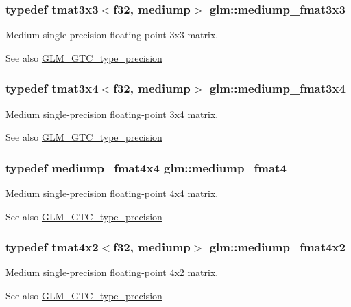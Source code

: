 \subsubsection[{mediump\+\_\+fmat3x3}]{\setlength{\rightskip}{0pt plus 5cm}typedef tmat3x3$<${\bf f32}, mediump$>$ {\bf glm\+::mediump\+\_\+fmat3x3}}\label{namespaceglm_a7719af89d88d87c3b60d7c9f06801711}
Medium single-\/precision floating-\/point 3x3 matrix. \begin{DoxySeeAlso}{See also}
\hyperlink{group__gtc__type__precision}{G\+L\+M\+\_\+\+G\+T\+C\+\_\+type\+\_\+precision} 
\end{DoxySeeAlso}
\hypertarget{namespaceglm_a02c8a6eb751559f13a412467d2241c6e}{}
\subsubsection[{mediump\+\_\+fmat3x4}]{\setlength{\rightskip}{0pt plus 5cm}typedef tmat3x4$<${\bf f32}, mediump$>$ {\bf glm\+::mediump\+\_\+fmat3x4}}\label{namespaceglm_a02c8a6eb751559f13a412467d2241c6e}
Medium single-\/precision floating-\/point 3x4 matrix. \begin{DoxySeeAlso}{See also}
\hyperlink{group__gtc__type__precision}{G\+L\+M\+\_\+\+G\+T\+C\+\_\+type\+\_\+precision} 
\end{DoxySeeAlso}
\hypertarget{namespaceglm_a6cd3ae1f3509b79061edcc83564769d4}{}
\subsubsection[{mediump\+\_\+fmat4}]{\setlength{\rightskip}{0pt plus 5cm}typedef {\bf mediump\+\_\+fmat4x4} {\bf glm\+::mediump\+\_\+fmat4}}\label{namespaceglm_a6cd3ae1f3509b79061edcc83564769d4}
Medium single-\/precision floating-\/point 4x4 matrix. \begin{DoxySeeAlso}{See also}
\hyperlink{group__gtc__type__precision}{G\+L\+M\+\_\+\+G\+T\+C\+\_\+type\+\_\+precision} 
\end{DoxySeeAlso}
\hypertarget{namespaceglm_ace18973339f3a369fc0413698ab88e2e}{}
\subsubsection[{mediump\+\_\+fmat4x2}]{\setlength{\rightskip}{0pt plus 5cm}typedef tmat4x2$<${\bf f32}, mediump$>$ {\bf glm\+::mediump\+\_\+fmat4x2}}\label{namespaceglm_ace18973339f3a369fc0413698ab88e2e}
Medium single-\/precision floating-\/point 4x2 matrix. \begin{DoxySeeAlso}{See also}
\hyperlink{group__gtc__type__precision}{G\+L\+M\+\_\+\+G\+T\+C\+\_\+type\+\_\+precision} 
\end{DoxySeeAlso}
\hypertarget{namespaceglm_ab86c2897e2958d40f3eac9cd5db9a172}{}
